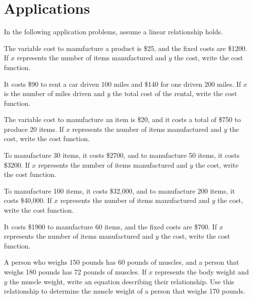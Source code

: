 \section{Applications}

In the following application problems, assume a linear relationship holds.

\begin{puzzle}
    The variable cost to manufacture a product is \$25, and the fixed costs are \$1200. If \( x \) represents the number of items manufactured and \( y \) the cost, write the cost function.
\end{puzzle}

\begin{puzzle}
    It costs \$90 to rent a car driven 100 miles and \$140 for one driven 200 miles. If \( x \) is the number of miles driven and \( y \) the total cost of the rental, write the cost function.
\end{puzzle}

\begin{puzzle}
    The variable cost to manufacture an item is \$20, and it costs a total of \$750 to produce 20 items. If \( x \) represents the number of items manufactured and \( y \) the cost, write the cost function.
\end{puzzle}

\begin{puzzle}
    To manufacture 30 items, it costs \$2700, and to manufacture 50 items, it costs \$3200. If \( x \) represents the number of items manufactured and \( y \) the cost, write the cost function.
\end{puzzle}

\begin{puzzle}
    To manufacture 100 items, it costs \$32,000, and to manufacture 200 items, it costs \$40,000. If \( x \) represents the number of items manufactured and \( y \) the cost, write the cost function.
\end{puzzle}

\begin{puzzle}
    It costs \$1900 to manufacture 60 items, and the fixed costs are \$700. If \( x \) represents the number of items manufactured and \( y \) the cost, write the cost function.
\end{puzzle}

\begin{puzzle}
    A person who weighs 150 pounds has 60 pounds of muscles, and a person that weighs 180 pounds has 72 pounds of muscles. If \( x \) represents the body weight and \( y \) the muscle weight, write an equation describing their relationship. Use this relationship to determine the muscle weight of a person that weighs 170 pounds.
\end{puzzle}

